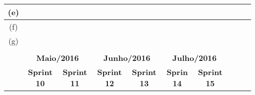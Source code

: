 \begin{table}[]
\begin{tabular}{|c|l|l|l|l|l|l|l|l|l|}
(e)                             &                                                 &                                         &                                         &                                         &                                        & \cellcolor[HTML]{C0C0C0}                &                                        &                                        &                                        \\ \hline
(f)                             &                                                 &                                         &                                         &                                         &                                        &                                         &                                        &                                        &                                        \\ \hline
(g)                             &                                                 &                                         &                                         &                                         &                                        &                                         &                                        &                                        &                                        \\ \hline
\rowcolor[HTML]{343434} 
                                &                                                 &                                         &                                         &                                         &                                        &                                         &                                        &                                        &                                        \\ \hline
                                & \multicolumn{2}{c|}{\textbf{Maio/2016}}                                                   & \multicolumn{2}{c|}{\textbf{Junho/2016}}                                          & \multicolumn{2}{c|}{\textbf{Julho/2016}}                                         & \multicolumn{3}{l|}{}                                                                                                    \\ \cline{1-7}
                                & \multicolumn{1}{c|}{\textbf{Sprint 10}}         & \multicolumn{1}{c|}{\textbf{Sprint 11}} & \multicolumn{1}{c|}{\textbf{Sprint 12}} & \multicolumn{1}{c|}{\textbf{Sprint 13}} & \multicolumn{1}{c|}{\textbf{Sprin 14}} & \multicolumn{1}{c|}{\textbf{Sprint 15}} & \multicolumn{3}{l|}{}                                                                                                    \\ \cline{1-7}

\end{tabular}
\end{table}
